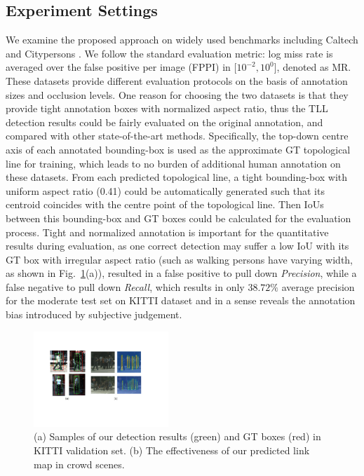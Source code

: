 \documentclass[runningheads]{llncs}
\begin{document}
\subsection{Experiment Settings}
We examine the proposed approach on widely used benchmarks including Caltech \cite{Caltech} and Citypersons \cite{CityPersons}. We follow the standard evaluation metric: log miss rate is averaged over the false positive per image (FPPI) in [$10^{{-}2}, 10^{0}$], denoted as MR. These datasets provide different evaluation protocols on the basis of annotation sizes and occlusion levels. One reason for choosing the two datasets is that they provide tight annotation boxes with normalized aspect ratio, thus the TLL detection results could be fairly evaluated on the original annotation, and compared with other state-of-the-art methods. Specifically, the top-down centre axis of each annotated bounding-box is used as the approximate GT topological line for training, which leads to no burden of additional human annotation on these datasets. From each predicted topological line, a tight bounding-box with uniform aspect ratio (0.41) could be automatically generated such that its centroid coincides with the centre point of the topological line. Then IoUs between this bounding-box and GT boxes could be calculated for the evaluation process. Tight and normalized annotation is important for the quantitative results during evaluation, as one correct detection may suffer a low IoU with its GT box with irregular aspect ratio (such as walking persons have varying width, as shown in Fig.~\ref{fig7}(a)), resulted in a false positive to pull down \textit{Precision}, while a false negative to pull down \textit{Recall}, which results in only $38.72 \%$ average precision for the moderate test set on KITTI dataset \cite{KITTI} and in a sense reveals the annotation bias introduced by subjective judgement.
\begin{figure}[t]
	\centering
	\includegraphics[height=3.6cm]{7_samples.pdf}
	\caption{(a) Samples of our detection results (green) and GT boxes (red) in KITTI validation set. (b) The effectiveness of our predicted link map in crowd scenes.}
	\label{fig7}
\end{figure}
\end{document}
